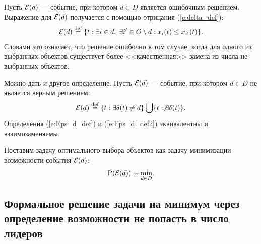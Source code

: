 Пусть $\mathcal{E}(d)$ --- событие, при котором $d \in D$ является ошибочным решением. Выражение для $\mathcal{E}(d)$ получается с помощью отрицания (\ref{e:delta_def}):
\begin{equation}
  \label{e:Eps_d_def}
  \mathcal{E}(d) \overset{\text{def}}{=} \{t: \exists i \in d,\; \exists i' \in O \setminus d: x_i(t) \leq x_{i'}(t)\}.
\end{equation}
Словами это означает, что решение ошибочно в том случае, когда для одного из выбранных объектов существует более <<качественная>> замена из числа не выбранных объектов.

Можно дать и другое определение. Пусть $\mathcal{E}(d)$ --- событие, при котором $d \in D$ не является верным решением:
\begin{equation}
  \label{e:Eps_d_def2}
  \mathcal{E}(d) \overset{\text{def}}{=} \{t: \exists \delta(t) \neq d\} \bigcup \{t: \not\exists \delta(t)\}. 
\end{equation}
Определения (\ref{e:Eps_d_def}) и (\ref{e:Eps_d_def2}) эквивалентны и взаимозаменяемы.


Поставим задачу оптимального выбора объектов как задачу минимизации возможности события $\mathcal{E}(d)$:
\begin{equation}
  \label{e:zadacha}
  {\mathrm{P}}(\mathcal{E}(d)) \sim \underset{d \in D} \min.
\end{equation}

\subsection{Формальное решение задачи на минимум через определение возможности не попасть в число лидеров}

